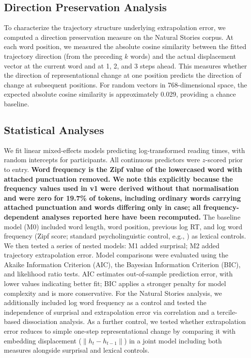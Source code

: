 \documentclass[12pt]{article}
\newcommand{\new}[1]{{\bfseries #1}}
\begin{document}
\subsection{Direction Preservation Analysis}

To characterize the trajectory structure underlying extrapolation error, we computed a direction preservation measure on the Natural Stories corpus. At each word position, we measured the absolute cosine similarity between the fitted trajectory direction (from the preceding $k$ words) and the actual displacement vector at the current word and at 1, 2, and 3 steps ahead. This measures whether the direction of representational change at one position predicts the direction of change at subsequent positions. For random vectors in 768-dimensional space, the expected absolute cosine similarity is approximately 0.029, providing a chance baseline.

\subsection{Statistical Analyses}

We fit linear mixed-effects models predicting log-transformed reading times, with random intercepts for participants. All continuous predictors were $z$-scored prior to entry. \new{Word frequency is the Zipf value of the lowercased word with attached punctuation removed. We note this explicitly because the frequency values used in v1 were derived without that normalisation and were zero for 19.7\% of tokens, including ordinary words carrying attached punctuation and words differing only in case; all frequency-dependent analyses reported here have been recomputed.} The baseline model (M0) included word length, word position, previous log RT, and log word frequency (Zipf score; standard psycholinguistic control, e.g., \citealp{smith2013}) as lexical controls. We then tested a series of nested models: M1 added surprisal; M2 added trajectory extrapolation error. Model comparisons were evaluated using the Akaike Information Criterion (AIC), the Bayesian Information Criterion (BIC), and likelihood ratio tests. AIC estimates out-of-sample prediction error, with lower values indicating better fit; BIC applies a stronger penalty for model complexity and is more conservative. For the Natural Stories analysis, we additionally included log word frequency as a control and tested the independence of surprisal and extrapolation error via correlation and a tercile-based dissociation analysis. As a further control, we tested whether extrapolation error reduces to simple one-step representational change by comparing it with embedding displacement ($\|h_t - h_{t-1}\|$) in a joint model including both measures alongside surprisal and lexical controls.
\end{document}
